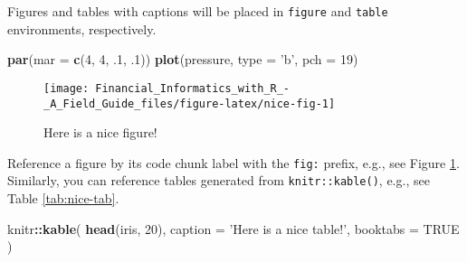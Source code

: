 \documentclass[]{book}
\newenvironment{Shaded}{\begin{snugshade}}{\end{snugshade}}
\newcommand{\KeywordTok}[1]{\textcolor[rgb]{0.13,0.29,0.53}{\textbf{#1}}}
\newcommand{\DataTypeTok}[1]{\textcolor[rgb]{0.13,0.29,0.53}{#1}}
\newcommand{\DecValTok}[1]{\textcolor[rgb]{0.00,0.00,0.81}{#1}}
\newcommand{\StringTok}[1]{\textcolor[rgb]{0.31,0.60,0.02}{#1}}
\newcommand{\OtherTok}[1]{\textcolor[rgb]{0.56,0.35,0.01}{#1}}
\newcommand{\OperatorTok}[1]{\textcolor[rgb]{0.81,0.36,0.00}{\textbf{#1}}}
\newcommand{\NormalTok}[1]{#1}
\begin{document}
Figures and tables with captions will be placed in \texttt{figure} and
\texttt{table} environments, respectively.

\begin{Shaded}
\begin{Highlighting}[]
\KeywordTok{par}\NormalTok{(}\DataTypeTok{mar =} \KeywordTok{c}\NormalTok{(}\DecValTok{4}\NormalTok{, }\DecValTok{4}\NormalTok{, .}\DecValTok{1}\NormalTok{, .}\DecValTok{1}\NormalTok{))}
\KeywordTok{plot}\NormalTok{(pressure, }\DataTypeTok{type =} \StringTok{'b'}\NormalTok{, }\DataTypeTok{pch =} \DecValTok{19}\NormalTok{)}
\end{Highlighting}
\end{Shaded}

\begin{figure}

{\centering \texttt{[image: Financial\_Informatics\_with\_R\_-\_A\_Field\_Guide\_files/figure-latex/nice-fig-1]} 

}

\caption{Here is a nice figure!}\label{fig:nice-fig}
\end{figure}

Reference a figure by its code chunk label with the \texttt{fig:}
prefix, e.g., see Figure \ref{fig:nice-fig}. Similarly, you can
reference tables generated from \texttt{knitr::kable()}, e.g., see Table
\ref{tab:nice-tab}.

\begin{Shaded}
\begin{Highlighting}[]
\NormalTok{knitr}\OperatorTok{::}\KeywordTok{kable}\NormalTok{(}
  \KeywordTok{head}\NormalTok{(iris, }\DecValTok{20}\NormalTok{), }\DataTypeTok{caption =} \StringTok{'Here is a nice table!'}\NormalTok{,}
  \DataTypeTok{booktabs =} \OtherTok{TRUE}
\NormalTok{)}
\end{Highlighting}
\end{Shaded}
\end{document}
